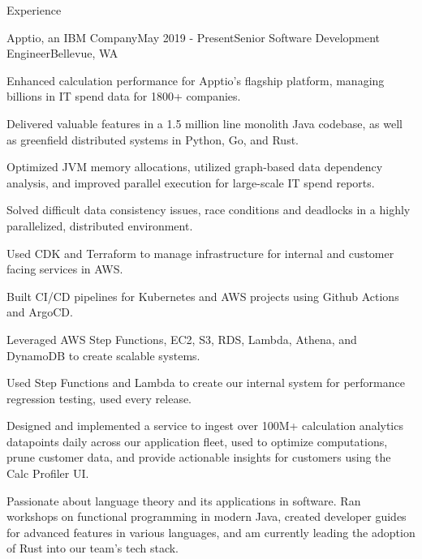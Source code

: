 \documentclass[
	11pt, %
]{resume} %
\begin{document}
\begin{rSection}{Experience}

   \begin{rSubsection}{Apptio, an IBM Company}{May 2019 - Present}{Senior Software Development Engineer}{Bellevue, WA}
        \item Enhanced calculation performance for Apptio's flagship platform, managing billions in IT spend data for 1800+ companies.
        \item Delivered valuable features in a 1.5 million line monolith Java codebase, as well as greenfield distributed systems in Python, Go, and Rust.
        \item Optimized JVM memory allocations, utilized graph-based data dependency analysis, and improved parallel execution for large-scale IT spend reports.
        \item Solved difficult data consistency issues, race conditions and deadlocks in a highly parallelized,
            distributed environment.
        \item Used CDK and Terraform to manage infrastructure for internal and customer facing services in AWS.
        \item Built CI/CD pipelines for Kubernetes and AWS projects using Github Actions and ArgoCD.
        \item Leveraged AWS Step Functions, EC2, S3, RDS, Lambda, Athena, and DynamoDB to create scalable systems.
        \item Used Step Functions and Lambda to create our internal system for performance regression testing, used every release.
        \item Designed and implemented a service to ingest over 100M+ calculation analytics datapoints daily across
            our application fleet, used to optimize computations, prune customer data, and provide actionable insights for customers using the Calc Profiler UI.
        \item Passionate about language theory and its applications in software. Ran workshops on functional
            programming in modern Java, created developer guides for advanced features in various languages, 
            and am currently leading the adoption of Rust into our team's tech stack.
   \end{rSubsection}


\end{rSection}
\end{document}
